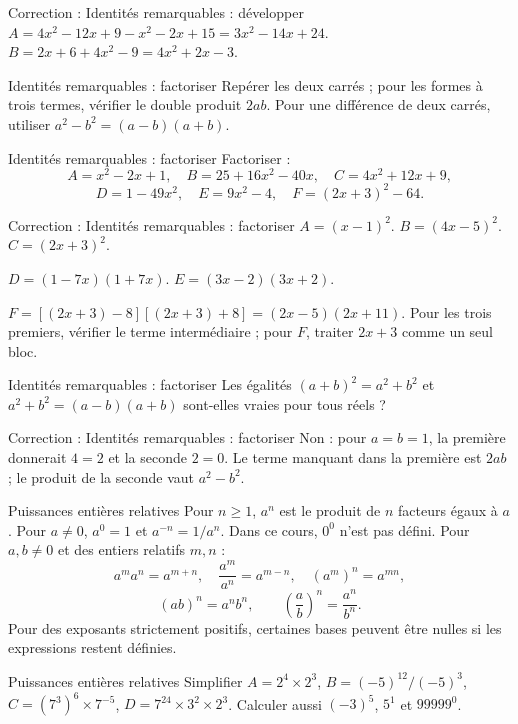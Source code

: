 \documentclass[aspectratio=169,10pt]{beamer}
\begin{document}
\begin{frame}{Correction : Identités remarquables : développer}
\(A=4x^2-12x+9-x^2-2x+15=3x^2-14x+24\). \(B=2x+6+4x^2-9=4x^2+2x-3\).
\end{frame}
\begin{frame}{Identités remarquables : factoriser}
Repérer les deux carrés ; pour les formes à trois termes, vérifier le double produit \(2ab\). Pour une différence de deux carrés, utiliser \(a^2-b^2=(a-b)(a+b)\).
\end{frame}
\begin{frame}{Identités remarquables : factoriser}
Factoriser :
\[A=x^2-2x+1,\quad B=25+16x^2-40x,\quad C=4x^2+12x+9,\]
\[D=1-49x^2,\quad E=9x^2-4,\quad F=(2x+3)^2-64.\]
\end{frame}
\begin{frame}{Correction : Identités remarquables : factoriser}
\(A=(x-1)^2\). \(B=(4x-5)^2\). \(C=(2x+3)^2\).

\(D=(1-7x)(1+7x)\). \(E=(3x-2)(3x+2)\).

\(F=[(2x+3)-8][(2x+3)+8]=(2x-5)(2x+11)\).
Pour les trois premiers, vérifier le terme intermédiaire ; pour \(F\), traiter \(2x+3\) comme un seul bloc.
\end{frame}
\begin{frame}{Identités remarquables : factoriser}
Les égalités \((a+b)^2=a^2+b^2\) et \(a^2+b^2=(a-b)(a+b)\) sont-elles vraies pour tous réels ?
\end{frame}
\begin{frame}{Correction : Identités remarquables : factoriser}
Non : pour \(a=b=1\), la première donnerait \(4=2\) et la seconde \(2=0\). Le terme manquant dans la première est \(2ab\) ; le produit de la seconde vaut \(a^2-b^2\).
\end{frame}
\begin{frame}{Puissances entières relatives}
Pour \(n\geq1\), \(a^n\) est le produit de \(n\) facteurs égaux à \(a\). Pour \(a\ne0\), \(a^0=1\) et \(a^{-n}=1/a^n\). Dans ce cours, \(0^0\) n'est pas défini.
Pour \(a,b\ne0\) et des entiers relatifs \(m,n\) :
\[a^ma^n=a^{m+n},\quad\dfrac{a^m}{a^n}=a^{m-n},\quad(a^m)^n=a^{mn},\]
\[(ab)^n=a^nb^n,\qquad\left(\dfrac ab\right)^n=\dfrac{a^n}{b^n}.\]
Pour des exposants strictement positifs, certaines bases peuvent être nulles si les expressions restent définies.
\end{frame}
\begin{frame}{Puissances entières relatives}
Simplifier \(A=2^4\times2^3\), \(B=(-5)^{12}/(-5)^3\), \(C=(7^3)^6\times7^{-5}\), \(D=7^{24}\times3^2\times2^3\). Calculer aussi \((-3)^5\), \(5^1\) et \(99999^0\).
\end{frame}
\end{document}
